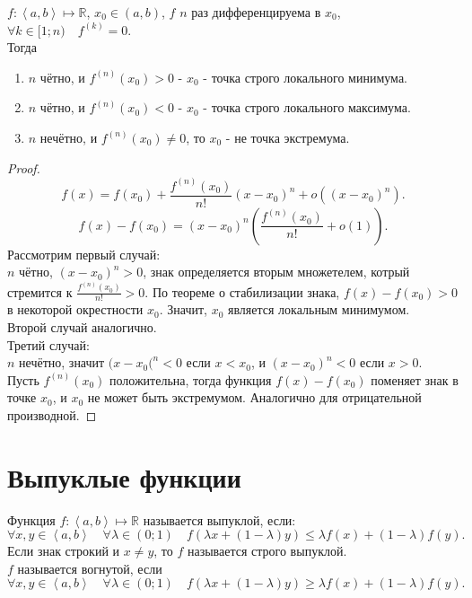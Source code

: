 \documentclass[11pt, oneside]{article}   	%
\begin{document}
    \begin{theorem}
        $f: \left<a, b\right> \mapsto \mathbb{R}$, $x_0\in (a, b)$, $f$ $n$ раз дифференцируема в $x_0$, $\forall{k\in [1; n)}\quad f^{(k)} = 0$.\\
        Тогда
        \begin{enumerate}
            \item $n$ чётно, и $f^{(n)}(x_0) > 0$ - $x_0$ - точка строго локального минимума.
            \item $n$ чётно, и $f^{(n)}(x_0) < 0$ - $x_0$ - точка строго локального максимума.
            \item $n$ нечётно, и $f^{(n)}(x_0) \neq  0$, то $x_0$ - не точка экстремума.
        \end{enumerate}
        \begin{proof}
            \[ f(x) = f(x_0) + \frac{f^{(n)}(x_0)}{n!}(x-x_0)^{n} + o((x-x_0)^{n}) .\]
            \[ f(x) - f(x_0) = (x-x_0)^{n}\left( \frac{f^{(n)}(x_0)}{n!} + o(1) \right)  .\] 
            Рассмотрим первый случай:\\
            $n$ чётно, $(x-x_0)^{n}>0$, знак определяется вторым множетелем, котрый стремится к $\frac{f^{(n)}(x_0)}{n!}>0$. По теореме о стабилизации знака, $f(x)-f(x_0)>0$ в некоторой окрестности $x_0$. Значит, $x_0$ является локальным минимумом.\\
            Второй случай аналогично.\\
            Третий случай:\\
            $n$ нечётно, значит $(x-x_0(^{n} < 0$ если $x<x_0$, и $(x-x_0)^{n}<0$ если $x>0$.\\
            Пусть $f^{(n)}(x_0)$ положительна, тогда функция $f(x)-f(x_0)$ поменяет знак в точке $x_0$, и $x_0$ не может быть экстремумом. Аналогично для отрицательной производной.
        \end{proof}
    \end{theorem}
\section{Выпуклые функции}
    \begin{definition}
        Функция $f: \left<a, b\right> \mapsto \mathbb{R}$ называется выпуклой, если:
        \[ \forall{x, y\in \left<a, b\right>}\quad \forall{\lambda\in (0; 1)}\quad f(\lambda x + (1-\lambda)y) \le \lambda f(x) + (1-\lambda)f(y) .\]
        Если знак строкий и $x\neq y$, то $f$ называется строго выпуклой.\\
        $f$ называется вогнутой, если 
        \[ \forall{x,y\in \left<a, b\right>}\quad \forall{\lambda\in (0; 1)}\quad f(\lambda x + (1-\lambda)y) \ge \lambda f(x) + (1-\lambda)f(y) .\]

    \end{definition}
\end{document}
